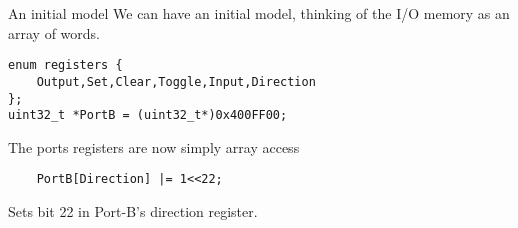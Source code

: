 \documentclass[xcolor=svgnames]{beamer}
\begin{document}
\begin{frame}[fragile]{An initial model}
    We can have an initial model, thinking of the I/O memory as an array of words.

    \begin{tcolorbox}
        \begin{verbatim}
enum registers {
    Output,Set,Clear,Toggle,Input,Direction
};
uint32_t *PortB = (uint32_t*)0x400FF00;
        \end{verbatim}
    \end{tcolorbox}

    The ports registers are now simply array access

    \begin{tcolorbox}
        \begin{verbatim}
    PortB[Direction] |= 1<<22;
        \end{verbatim}
    \end{tcolorbox}
    Sets bit 22 in Port-B's direction register.
\end{frame}
\end{document}
